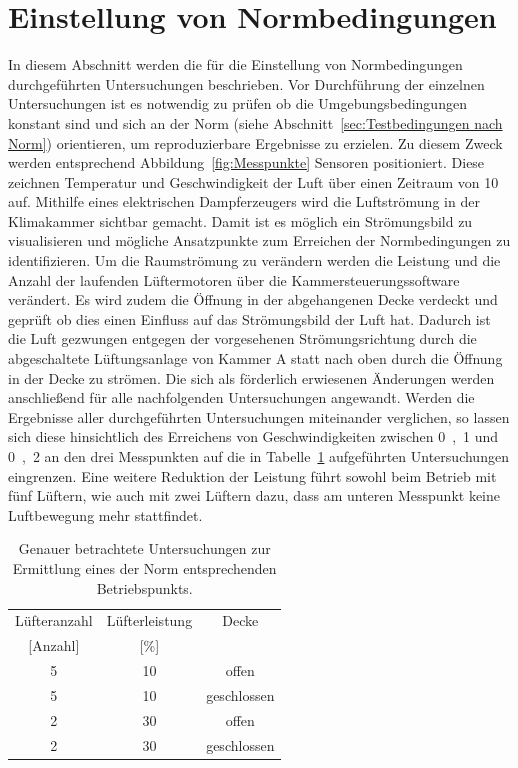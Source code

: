


\section{Einstellung von Normbedingungen}
\label{sec:EinstellungvonNormbedingungen}

In diesem Abschnitt werden die für die Einstellung von Normbedingungen durchgeführten Untersuchungen beschrieben.
Vor Durchführung der einzelnen Untersuchungen ist es notwendig zu prüfen ob die Umgebungsbedingungen konstant sind und sich an der Norm (siehe Abschnitt~\ref{sec:Testbedingungen nach Norm}) orientieren, um reproduzierbare Ergebnisse zu erzielen. Zu diesem Zweck werden entsprechend Abbildung~\ref{fig:Messpunkte} Sensoren positioniert. Diese zeichnen Temperatur und Geschwindigkeit der Luft über einen Zeitraum von \unit{10}{\min} auf. Mithilfe eines elektrischen Dampferzeugers wird die Luftströmung in der Klimakammer sichtbar gemacht. Damit ist es möglich ein Strömungsbild zu visualisieren und mögliche Ansatzpunkte zum Erreichen der Normbedingungen zu identifizieren. Um die Raumströmung zu verändern werden die Leistung und die Anzahl der laufenden Lüftermotoren über die Kammersteuerungssoftware verändert. Es wird zudem die Öffnung in der abgehangenen Decke verdeckt und geprüft ob dies einen Einfluss auf das Strömungsbild der Luft hat. Dadurch ist die Luft gezwungen entgegen der vorgesehenen Strömungsrichtung durch die abgeschaltete Lüftungsanlage von Kammer A statt nach oben durch die Öffnung in der Decke zu strömen. Die sich als förderlich erwiesenen Änderungen werden anschließend für alle nachfolgenden Untersuchungen angewandt. \newline
Werden die Ergebnisse aller durchgeführten Untersuchungen miteinander verglichen, so lassen sich diese hinsichtlich des Erreichens von Geschwindigkeiten zwischen \unit{0,1}{\meter\per\second} und \unit{0,2}{\meter\per\second} an den drei Messpunkten auf die in Tabelle~\ref{tab:Lüfterleistungen} aufgeführten Untersuchungen eingrenzen. Eine weitere Reduktion der Leistung führt sowohl beim Betrieb mit fünf Lüftern, wie auch mit zwei Lüftern dazu, dass am unteren Messpunkt keine Luftbewegung mehr stattfindet. \

\begin{table}[h!]
\centering
\caption{Genauer betrachtete Untersuchungen zur Ermittlung eines der Norm entsprechenden Betriebspunkts.}
\label{tab:Lüfterleistungen}
\begin{tabular}{|ccc|}
\hline
Lüfteranzahl            & Lüfterleistung          & Decke       \\
{[}Anzahl{]}            & {[}\%{]}                &             \\ \hline
\multicolumn{1}{|c|}{5} & \multicolumn{1}{c|}{10} & offen       \\
\multicolumn{1}{|c|}{5} & \multicolumn{1}{c|}{10} & geschlossen \\
\multicolumn{1}{|c|}{2} & \multicolumn{1}{c|}{30} & offen       \\
\multicolumn{1}{|c|}{2} & \multicolumn{1}{c|}{30} & geschlossen \\ \hline
\end{tabular}
\end{table}

